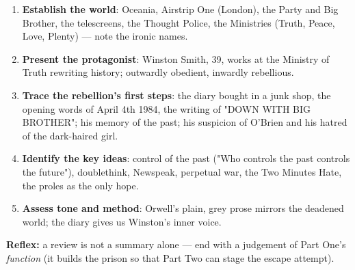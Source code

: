 \documentclass[11pt]{article}
\begin{document}
\begin{methode}
\begin{enumerate}
\item \textbf{Establish the world}: Oceania, Airstrip One (London), the Party and Big Brother, the telescreens, the Thought Police, the Ministries (Truth, Peace, Love, Plenty) — note the ironic names.
\item \textbf{Present the protagonist}: Winston Smith, 39, works at the Ministry of Truth rewriting history; outwardly obedient, inwardly rebellious.
\item \textbf{Trace the rebellion's first steps}: the diary bought in a junk shop, the opening words of April 4th 1984, the writing of "DOWN WITH BIG BROTHER"; his memory of the past; his suspicion of O'Brien and his hatred of the dark-haired girl.
\item \textbf{Identify the key ideas}: control of the past ("Who controls the past controls the future"), doublethink, Newspeak, perpetual war, the Two Minutes Hate, the proles as the only hope.
\item \textbf{Assess tone and method}: Orwell's plain, grey prose mirrors the deadened world; the diary gives us Winston's inner voice.
\end{enumerate}
\textbf{Reflex:} a review is not a summary alone — end with a judgement of Part One's \emph{function} (it builds the prison so that Part Two can stage the escape attempt).
\end{methode}
\end{document}
